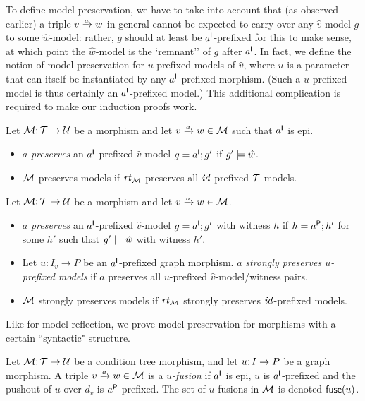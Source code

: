 To define model preservation, we have to take into account that (as observed earlier) a triple $\trip vaw$ in general cannot be expected to carry over any $\hat v$-model $g$ to some $\hat w$-model: rather, $g$ should at least be $a\I$-prefixed for this to make sense, at which point the $\hat w$-model is the `remnant'' of $g$ after $a\I$. In fact, we define the notion of model preservation for $u$-prefixed models of $\hat v$, where $u$ is a parameter that can itself be instantiated by any $a\I$-prefixed morphism. (Such a $u$-prefixed model is thus certainly an $a\I$-prefixed model.) This additional complication is required to make our induction proofs work.
%
\begin{definition}
Let $\cM\of \cT\to\cU$ be a morphism and let $\trip vaw\in\cM$ such that $a\I$ is epi.
\begin{itemize}[topsep=\smallskipamount]
\item $a$ \emph{preserves} an $a\I$-prefixed $\hat v$-model $g=a\I;g'$ if $g'\sat \hat w$.
		
\item $\cM$ preserves models if $\rt\cM$ preserves all $\id$-prefixed $\cT$-models.
\end{itemize}
\end{definition}
%
\begin{definition}
Let $\cM\of \cT\to\cU$ be a morphism and let $\trip vaw\in\cM$.
\begin{itemize}[topsep=\smallskipamount]
\item $a$ \emph{preserves} an $a\I$-prefixed $\hat v$-model $g=a\I;g'$ with witness $h$ if $h=a\P;h'$ for some $h'$ such that $g'\sat \hat w$ with witness $h'$.
		
\item Let $u:I_v\to P$ be an $a\I$-prefixed graph morphism. $a$ \emph{strongly preserves $u$-prefixed models} if $a$ preserves all $u$-prefixed $\hat v$-model/witness pairs.
		
\item $\cM$ strongly preserves models if $\rt\cM$ strongly preserves $\id$-prefixed models.
\end{itemize}
\end{definition}
%
Like for model reflection, we prove model preservation for morphisms with a certain ``syntactic" structure.

\begin{definition}
Let $\cM\of \cT\to\cU$ be a condition tree morphism, and let $u\of I\to P$ be a graph morphism. A triple $\trip vaw\in\cM$ is a \emph{$u$-fusion} if $a\I$ is epi, $u$ is $a\I$-prefixed and the pushout of $u$ over $d_v$ is $a\P$-prefixed. The set of $u$-fusions in $\cM$ is denoted $\fuse(u)$.
\end{definition}

